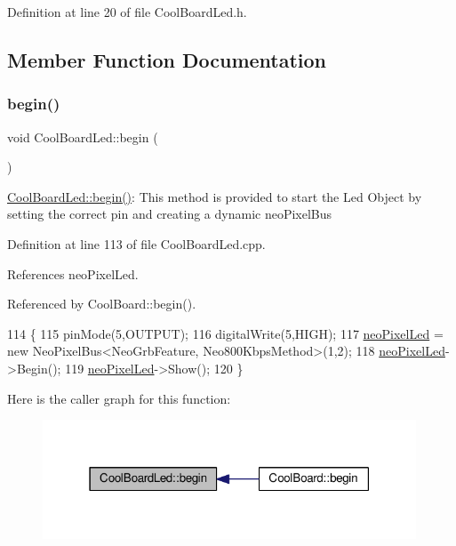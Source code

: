 Definition at line 20 of file Cool\+Board\+Led.\+h.



\subsection{Member Function Documentation}
\mbox{\label{classCoolBoardLed_ae3cbde8affcc6f011cbd698c8ef911f6}} 
\subsubsection{\texorpdfstring{begin()}{begin()}}
{\footnotesize\ttfamily void Cool\+Board\+Led\+::begin (\begin{DoxyParamCaption}{ }\end{DoxyParamCaption})}

\hyperlink{classCoolBoardLed_ae3cbde8affcc6f011cbd698c8ef911f6}{Cool\+Board\+Led\+::begin()}\+: This method is provided to start the Led Object by setting the correct pin and creating a dynamic neo\+Pixel\+Bus 

Definition at line 113 of file Cool\+Board\+Led.\+cpp.



References neo\+Pixel\+Led.



Referenced by Cool\+Board\+::begin().


\begin{DoxyCode}
114 \{
115     pinMode(5,OUTPUT);
116     digitalWrite(5,HIGH);
117     \hyperlink{classCoolBoardLed_ac2c13fa462a010cd9242bf297c013923}{neoPixelLed} = \textcolor{keyword}{new} NeoPixelBus<NeoGrbFeature, Neo800KbpsMethod>(1,2); 
118     \hyperlink{classCoolBoardLed_ac2c13fa462a010cd9242bf297c013923}{neoPixelLed}->Begin();
119     \hyperlink{classCoolBoardLed_ac2c13fa462a010cd9242bf297c013923}{neoPixelLed}->Show();
120 \} 
\end{DoxyCode}
Here is the caller graph for this function\+:\nopagebreak
\begin{figure}[H]
\begin{center}
\leavevmode
\includegraphics[width=315pt]{classCoolBoardLed_ae3cbde8affcc6f011cbd698c8ef911f6_icgraph}
\end{center}
\end{figure}
\mbox{\label{classCoolBoardLed_a27706bc029f6a126c55d0b91624ad7fa}} 
